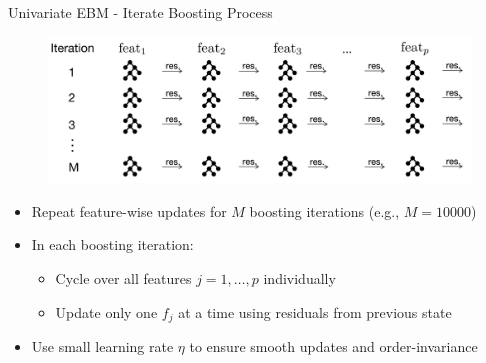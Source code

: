 \documentclass[10pt,compress,t,notes=noshow, xcolor=table]{beamer}
\begin{document}
\begin{frame}{Univariate EBM - Iterate Boosting Process}
\begin{figure}
    \centering
    \includegraphics[width=\linewidth]{figure/EBM_Step3.png}
\end{figure}
\begin{itemize}
    \item Repeat feature-wise updates for $M$ boosting iterations (e.g., $M=10000$)
    \item In each boosting iteration:
    \begin{itemize}
        \item Cycle over all features $j=1,\dots,p$ individually %
        \item Update only one $f_j$ at a time using residuals from previous state
    \end{itemize}
    \item Use small learning rate $\eta$ to ensure smooth updates and order-invariance
\end{itemize}
\end{frame}














\end{document}
